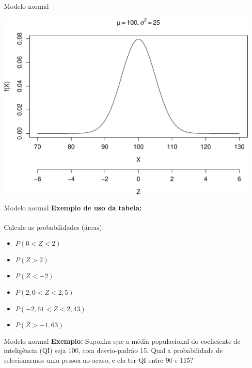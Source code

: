 \documentclass[10pt]{beamer}\usepackage[]{graphicx}\usepackage[]{color}
\newenvironment{knitrout}{}{} %
\theoremstyle{definition}
\begin{document}
\begin{frame}[fragile]{Modelo normal}
\begin{knitrout}\footnotesize
{}\color{fgcolor}

{\centering \includegraphics[width=1\textwidth]{figure/unnamed-chunk-6-1} 

}



\end{knitrout}
\end{frame}

\begin{frame}[fragile]{Modelo normal}
  \textbf{Exemplo de uso da tabela:} \\~\\
  Calcule as probabilidades (áreas):
  \begin{itemize}
  \item $P(0 < Z < 2)$
  \item $P(Z > 2)$
  \item $P(Z < -2)$
  \item $P(2,0 < Z < 2,5)$
  \item $P(-2,61 < Z < 2,43)$
  \item $P(Z > -1,63)$
  \end{itemize}
\end{frame}

\begin{frame}[fragile]{Modelo normal}
  \textbf{Exemplo:} Suponha que a média populacional do coeficiente de
  inteligência (QI) seja 100, com desvio-padrão 15. Qual a probabilidade
  de selecionarmos uma pessoa ao acaso, e ela ter QI entre 90 e 115?
\end{frame}
\end{document}
